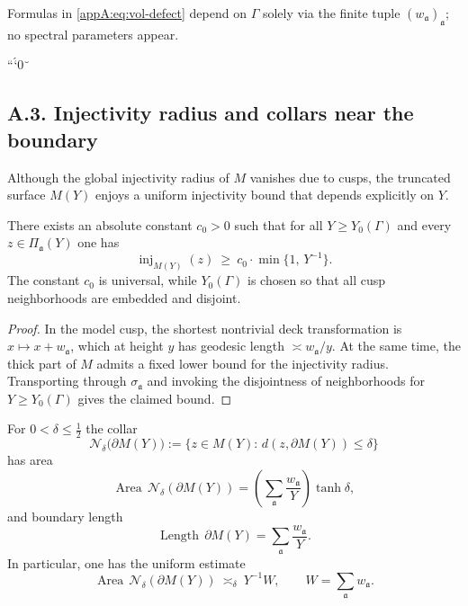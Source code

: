 \begin{remark}
\label{appA:rmk:geom-dependence}
Formulas in \eqref{appA:eq:vol-defect} depend on $\Gamma$ solely via the finite
tuple $(w_{\mathfrak{a}})_{\mathfrak{a}}$; no spectral parameters appear.
\end{remark}
```0

\subsection*{A.3. Injectivity radius and collars near the boundary}

Although the global injectivity radius of $M$ vanishes due to cusps,
the truncated surface $M(Y)$ enjoys a uniform injectivity bound
that depends explicitly on $Y$.

\begin{lemma}\label{lem:appA:inj-cusp}
There exists an absolute constant $c_0>0$ such that for all
$Y\ge Y_0(\Gamma)$ and every $z\in \Pi_{\mathfrak a}(Y)$ one has
\[
\operatorname{inj}_{M(Y)}(z)\ \ge\ c_0\cdot \min\{1,\,Y^{-1}\}.
\]
The constant $c_0$ is universal, while $Y_0(\Gamma)$ is chosen so that
all cusp neighborhoods are embedded and disjoint.
\end{lemma}

\begin{proof}
In the model cusp, the shortest nontrivial deck transformation is
$x\mapsto x+w_{\mathfrak a}$, which at height $y$ has geodesic length
$\asymp w_{\mathfrak a}/y$. At the same time, the thick part of $M$
admits a fixed lower bound for the injectivity radius. Transporting
through $\sigma_{\mathfrak a}$ and invoking the disjointness of
neighborhoods for $Y\ge Y_0(\Gamma)$ gives the claimed bound.
\end{proof}

\begin{proposition}\label{prop:appA:collar}
For $0<\delta\le \tfrac12$ the collar
\[
\mathcal N_\delta\!\big(\partial M(Y)\big)
:=\{z\in M(Y):\, d(z,\partial M(Y))\le \delta\}
\]
has area
\[
\operatorname{Area}\,\mathcal N_\delta(\partial M(Y))
=\left(\sum_{\mathfrak a}\frac{w_{\mathfrak a}}{Y}\right)\tanh\delta,
\]
and boundary length
\[
\operatorname{Length}\,\partial M(Y)=\sum_{\mathfrak a}\frac{w_{\mathfrak a}}{Y}.
\]
In particular, one has the uniform estimate
\[
\operatorname{Area}\,\mathcal N_\delta(\partial M(Y))\ \asymp_\delta\ Y^{-1}W,
\qquad W=\sum_{\mathfrak a} w_{\mathfrak a}.
\]
\end{proposition}

